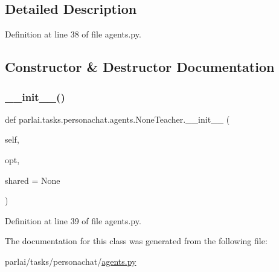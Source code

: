 \subsection{Detailed Description}


Definition at line 38 of file agents.\+py.



\subsection{Constructor \& Destructor Documentation}
\mbox{\label{classparlai_1_1tasks_1_1personachat_1_1agents_1_1NoneTeacher_af7f3226c57f6d0c8fce6d670b03a4c2a}} 
\subsubsection{\texorpdfstring{\+\_\+\+\_\+init\+\_\+\+\_\+()}{\_\_init\_\_()}}
{\footnotesize\ttfamily def parlai.\+tasks.\+personachat.\+agents.\+None\+Teacher.\+\_\+\+\_\+init\+\_\+\+\_\+ (\begin{DoxyParamCaption}\item[{}]{self,  }\item[{}]{opt,  }\item[{}]{shared = {\ttfamily None} }\end{DoxyParamCaption})}



Definition at line 39 of file agents.\+py.



The documentation for this class was generated from the following file\+:\begin{DoxyCompactItemize}
\item 
parlai/tasks/personachat/\hyperlink{parlai_2tasks_2personachat_2agents_8py}{agents.\+py}\end{DoxyCompactItemize}
